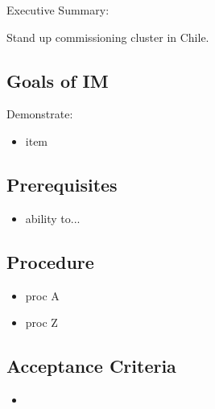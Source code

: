
Executive Summary:

Stand up commissioning cluster in Chile.

\subsection{Goals of IM}
Demonstrate:
\begin{itemize}
\item item
\end{itemize}

\subsection{Prerequisites}
\begin{itemize}
\item ability to...
\end{itemize}

\subsection{Procedure}
\begin{itemize}
\item proc A
\item proc Z
\end{itemize}

\subsection{Acceptance Criteria}
\begin{itemize}
\item
\end{itemize}
